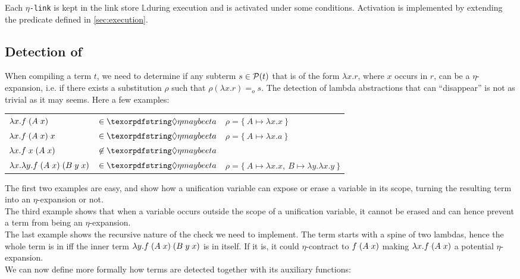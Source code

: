 \documentclass[sigconf,natbib=false,review]{acmart}
\newcommand{\appsep}{\ensuremath{\textcolor{lightgray}{\cdot}}}
\newcommand{\EqualRel}{\ensuremath{=}}
\newcommand{\Eo}{\ensuremath{\EqualRel_o}\xspace}
\newcommand{\linkMacro}[1]{\ensuremath{#1}\texttt{-link}\xspace}
\newcommand{\linketa} {\linkMacro{\eta}}
\newcommand{\linkStore}{\texorpdfstring{\ensuremath{\mathbb{L}}\xspace}{L}}
\begin{document}
Each \linketa is kept in the link store \linkStore during execution
and is activated under some conditions.
Activation is implemented by extending the 
predicate defined in \cref{sec:execution}.

\subsection{Detection of \maybeeta}\label{sec:etadetection}

When compiling a term $t$, we need to determine if any
subterm $s \in \mathcal{P}(t)$ that is of the form $\lambda x. r$,
where $x$ occurs in $r$, can be a $\eta$-expansion, i.e. if
there exists a substitution $\rho$ such that $\rho (\lambda x.r) \Eo s$.
The detection of lambda abstractions that can ``disappear''
is not as trivial as it may seems. Here a few examples:
%
\begin{center}
  \begin{tabular}{lll}
    $\lambda x. f \appsep (A \appsep x)$ & $\in\maybeeta$ & $\rho = \{~ A \mapsto \lambda x.x ~\}$ \\
    $\lambda x. f \appsep (A \appsep x) \appsep x$ & $\in\maybeeta$ & $\rho = \{~ A \mapsto \lambda x.a ~\}$\\
    $\lambda x. f \appsep x \appsep (A \appsep x)$ & $\not\in\maybeeta$ &\\
    $\lambda x. \lambda y. f \appsep (A \appsep x) \appsep (B \appsep y \appsep x)$ & $\in\maybeeta$ & $\rho = \{~ A \mapsto \lambda x.x,~ B \mapsto \lambda y.\lambda x.y ~\}$
  \end{tabular}
\end{center}
\vspace{4pt}

\noindent
The first two examples are easy, and show how a unification variable can expose
or erase a variable in its scope, turning the resulting term into an $\eta$-expansion or not.\\
The third example shows that when a variable occurs outside the scope of a unification
variable, it cannot be erased and can hence prevent a term from being an $\eta$-expansion.\\
The last example shows the recursive nature of the check we need to implement.
The term starts with a spine of two lambdas, hence the whole term
is in \maybeeta iff the inner term $\lambda y.f\appsep (A \appsep x) \appsep (B \appsep y \appsep x)$
is in \maybeeta itself. If it is, it could $\eta$-contract to
$f \appsep (A \appsep x)$ making $\lambda x.f \appsep (A \appsep x)$ a potential
$\eta$-expansion.\\
We can now define more formally how \maybeeta terms are detected together with
its auxiliary functions:
\end{document}
